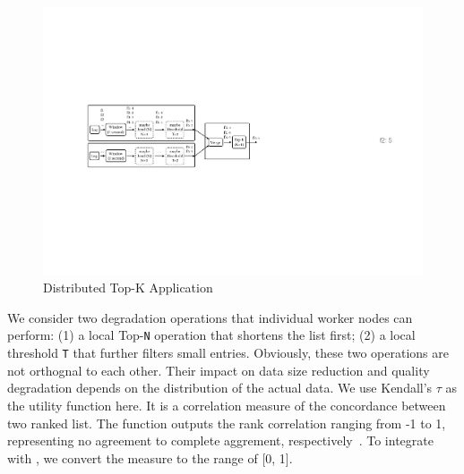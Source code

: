 \begin{figure}
  \centering
  \includegraphics[width=\columnwidth]{figures/topk.pdf}
  \caption{Distributed Top-K Application}
  \label{fig:topk}
\end{figure}

We consider two degradation operations that individual worker nodes can perform:
(1) a local Top-\texttt{N} operation that shortens the list first; (2) a local
threshold \texttt{T} that further filters small entries. Obviously, these two
operations are not orthognal to each other. Their impact on data size reduction
and quality degradation depends on the distribution of the actual data. We use
Kendall's $\tau$ as the utility function here. It is a correlation measure of
the concordance between two ranked list. The function outputs the rank
correlation ranging from -1 to 1, representing no agreement to complete
aggrement, respectively~\cite{abdi2007kendall}. To integrate with \sysname{}, we
convert the measure to the range of [0, 1].

